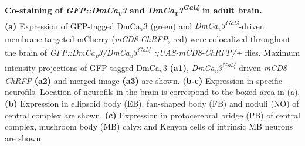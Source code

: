 \label{fig:S1}
\textbf{Co-staining of \emph{GFP::DmCa\textsubscript{v}3} and \emph{DmCa\textsubscript{v}3\textsuperscript{Gal4}} in adult brain.}
\\
\textbf{(a)} Expression of GFP-tagged DmCa\textsubscript{v}3 (green) and \emph{DmCa\textsubscript{v}3\textsuperscript{Gal4}}-driven membrane-targeted mCherry (\emph{mCD8-ChRFP}, red) were colocalized throughout the brain of \emph{GFP::DmCa\textsubscript{v}3/DmCa\textsubscript{v}3\textsuperscript{Gal4} ;;UAS-mCD8-ChRFP/+} flies.
Maximum intensity projections of GFP-tagged DmCa\textsubscript{v}3 \textbf{(a1)},  \emph{DmCa\textsubscript{v}3\textsuperscript{Gal4}}-driven \emph{mCD8-ChRFP} \textbf{(a2)} and merged image \textbf{(a3)} are shown.
\textbf{(b-c)} Expression in specific neurofils. Location of neurofils in the brain is correspond to the boxed area in (a).
\textbf{(b)} Expression in ellipsoid body (EB), fan-shaped body (FB) and noduli (NO) of central complex are shown.
\textbf{(c)} Expression in protocerebral bridge (PB) of central complex, mushroom body (MB) calyx and Kenyon cells of intrinsic MB neurons are shown. 
  
  
  